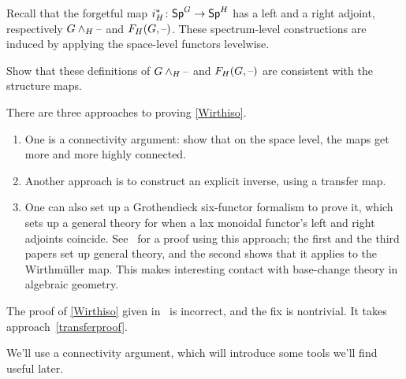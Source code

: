 Recall that the forgetful map $i_H^*\colon \mathsf{Sp}^G\to\mathsf{Sp}^H$ has a left and a right adjoint, respectively
$G\wedge_H\text{--}$ and $F_H(G,\text{--})$. These spectrum-level constructions are induced by applying the space-level
functors levelwise.
\begin{ex}
Show that these definitions of $G\wedge_H\text{--}$ and $F_H(G,\text{--})$ are consistent with the structure maps.
\end{ex}
There are three approaches to proving \cref{Wirthiso}.
\begin{enumerate}
	\item One is a connectivity argument: show that on the space level, the maps get more and more highly
	connected.
	\item\label{transferproof} Another approach is to construct an explicit inverse, using a transfer map.
	\item One can also set up a Grothendieck six-functor formalism to prove it, which sets up a general theory for
	when a lax monoidal functor's left and right adjoints coincide. See~\cite{FHM, WirthRevisited, BDS} for a proof
	using this approach; the first and the third papers set up general theory, and the second shows that it applies
	to the Wirthmüller map. This makes interesting contact with base-change theory in algebraic
	geometry.
\end{enumerate}
\begin{warn}
The proof of \cref{Wirthiso} given in~\cite{LMS} is incorrect, and the fix is nontrivial. It takes
approach~\eqref{transferproof}.
\end{warn}
We'll use a connectivity argument, which will introduce some tools we'll find useful later.
